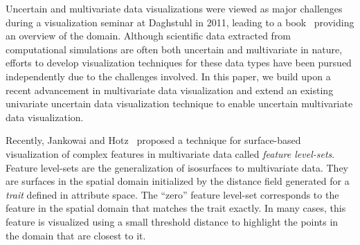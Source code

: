 Uncertain and multivariate data visualizations were viewed as major challenges during a visualization seminar at Daghstuhl in 2011, leading to a book~\cite{hansen2014scientific} providing an overview of the domain. 
%
Although scientific data extracted from computational simulations are often both uncertain and multivariate in nature, efforts to develop visualization techniques for these data types have been pursued independently due to the challenges involved.
%
In this paper, we build upon a recent advancement in multivariate data visualization and extend an existing univariate uncertain data visualization technique to enable uncertain multivariate data visualization.

Recently, Jankowai and Hotz~\cite{jankowai2020feature} proposed a technique for surface-based visualization of complex features in multivariate data called \textit{feature level-sets}. 
%
Feature level-sets are the generalization of isosurfaces to multivariate data.
%
They are surfaces in the spatial domain initialized by the distance field generated for a \textit{trait} defined in attribute space.
%
The ``zero'' feature level-set corresponds to the feature in the spatial domain that matches the trait exactly.
%
In many cases, this feature is visualized using a small threshold distance to highlight the points in the domain that are closest to it. 
%
%

